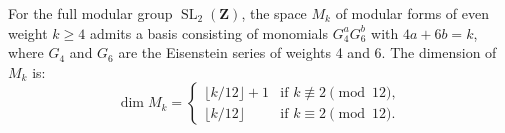 For the full modular group $\operatorname{SL}_2(\mathbf{Z})$, the space $M_k$ of modular forms of even weight $k \geq 4$ admits a basis consisting of monomials $G_4^a G_6^b$ with $4a + 6b = k$, where $G_4$ and $G_6$ are the Eisenstein series of weights 4 and 6. The dimension of $M_k$ is:
$$
\dim M_k = \begin{cases}
\lfloor k/12 \rfloor + 1 & \text{if } k \not\equiv 2 \pmod{12}, \\
\lfloor k/12 \rfloor & \text{if } k \equiv 2 \pmod{12}.
\end{cases}
$$
